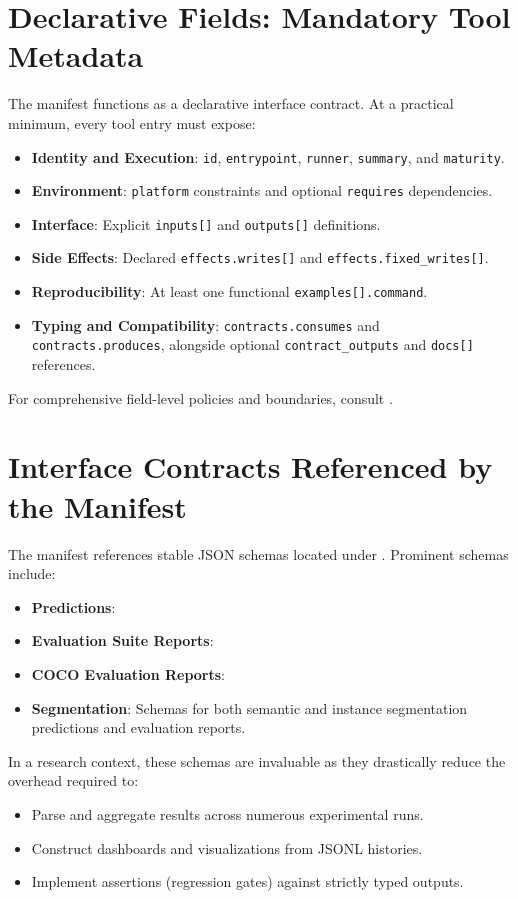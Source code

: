 \section{Declarative Fields: Mandatory Tool Metadata}
The manifest functions as a declarative interface contract. At a practical minimum, every tool entry must expose:
\begin{itemize}
  \item \textbf{Identity and Execution}: \texttt{id}, \texttt{entrypoint}, \texttt{runner}, \texttt{summary}, and \texttt{maturity}.
  \item \textbf{Environment}: \texttt{platform} constraints and optional \texttt{requires} dependencies.
  \item \textbf{Interface}: Explicit \texttt{inputs[]} and \texttt{outputs[]} definitions.
  \item \textbf{Side Effects}: Declared \texttt{effects.writes[]} and \texttt{effects.fixed\_writes[]}.
  \item \textbf{Reproducibility}: At least one functional \texttt{examples[].command}.
  \item \textbf{Typing and Compatibility}: \texttt{contracts.consumes} and \texttt{contracts.produces}, alongside optional \texttt{contract\_outputs} and \texttt{docs[]} references.
\end{itemize}

For comprehensive field-level policies and boundaries, consult .

\section{Interface Contracts Referenced by the Manifest}
The manifest references stable JSON schemas located under . Prominent schemas include:
\begin{itemize}
  \item \textbf{Predictions}: 
  \item \textbf{Evaluation Suite Reports}: 
  \item \textbf{COCO Evaluation Reports}: 
  \item \textbf{Segmentation}: Schemas for both semantic and instance segmentation predictions and evaluation reports.
\end{itemize}

In a research context, these schemas are invaluable as they drastically reduce the overhead required to:
\begin{itemize}
  \item Parse and aggregate results across numerous experimental runs.
  \item Construct dashboards and visualizations from JSONL histories.
  \item Implement assertions (regression gates) against strictly typed outputs.
\end{itemize}

